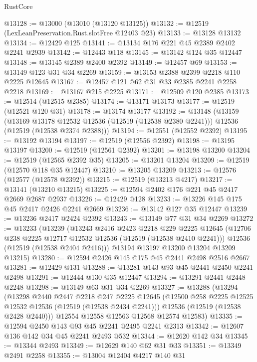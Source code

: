 \begin{lexlean}{RustCore}
\begin{coremodule}
@13128 := @13000 (@13010 (@13120 @13125))
@13132 := @12519 (LexLeanPreservation.Rust.slotFree @12403 @23)
@13133 := @13128 @13132
@13134 := @12429 @125
@13141 := @13134 @176 @221 @45 @2389 @2402 @2241 @2939
@13142 := @12443 @118
@13145 := @13142 @124 @35 @12447
@13148 := @13145 @2389 @2400 @2392
@13149 := @12457 @69
@13153 := @13149 @123 @31 @34 @2269
@13159 := @13153 @2388 @2399 @2218 @110 @2225 @12645
@13167 := @12457 @121 @62 @31 @33 @2385 @2241 @2258 @2218
@13169 := @13167 @215 @2225
@13171 := @12509 @120 @2385
@13173 := @12514 (@12515 @2385)
@13174 := @13171 @13173
@13177 := @12519 (@12521 @120 @31)
@13178 := @13174 @13177
@13192 := @13148
    (@13159
      (@13169 @13178 @12532 @12536 (@12519 (@12538 @2380 @2241)))
      @12536
      (@12519 (@12538 @2374 @2388)))
@13194 := @12551 (@12552 @2392)
@13195 := @13192 @13194
@13197 := @12519 (@12556 @2392)
@13198 := @13195 @13197
@13200 := @12519 (@12561 @2392)
@13201 := @13198 @13200
@13204 := @12519 (@12565 @2392 @35)
@13205 := @13201 @13204
@13209 := @12519 (@12570 @118 @35 @12447)
@13210 := @13205 @13209
@13213 := @12576 (@12577 (@12578 @2392))
@13215 := @12519 (@13213 @4217)
@13217 := @13141 (@13210 @13215)
@13225 := @12594 @2402 @176 @221 @45 @2417 @2669 @2687 @2937
@13226 := @12429 @128
@13233 := @13226 @145 @175 @45 @2417 @2426 @2241 @2669
@13236 := @13142 @127 @35 @12447
@13239 := @13236 @2417 @2424 @2392
@13243 := @13149 @77 @31 @34 @2269
@13272 := @13233
    (@13239
      (@13243
        @2416
        @2423
        @2218
        @229
        @2225
        @12645
        (@12706 @238 @2225 @12717 @12532 @12536 (@12519 (@12538 @2410 @2241)))
        @12536
        (@12519 (@12538 @2404 @2416)))
      @13194
      @13197
      @13200
      @13204
      @13209
      @13215)
@13280 := @12594 @2426 @145 @175 @45 @2441 @2498 @2516 @2667
@13281 := @12429 @131
@13288 := @13281 @143 @93 @45 @2441 @2450 @2241 @2498
@13291 := @12444 @130 @35 @12447
@13294 := @13291 @2441 @2448 @2248
@13298 := @13149 @63 @31 @34 @2269
@13327 := @13288
    (@13294
      (@13298
        @2440
        @2447
        @2218
        @247
        @2225
        @12645
        (@12500 @258 @2225 @12525 @12532 @12536 (@12519 (@12538 @2434 @2241)))
        @12536
        (@12519 (@12538 @2428 @2440)))
      @12554
      @12558
      @12563
      @12568
      @12574
      @12583)
@13335 := @12594 @2450 @143 @93 @45 @2241 @2495 @2241 @2313
@13342 := @12607 @136 @142 @34 @45 @2241 @2493 @532
@13344 := @12620 @142 @34
@13345 := @13344 @2493
@13349 := @12629 @140 @62 @31 @33
@13351 := @13349 @2491 @2258
@13355 := @13004 @12404 @4217 @140 @31

\end{coremodule}
\end{lexlean}
